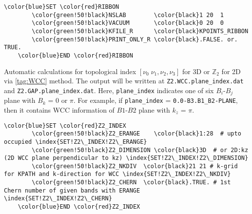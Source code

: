 \documentclass[a4paper,12pt]{scrartcl}
\makeatletter
\def\namedlabel#1#2{\begingroup
    #2%
    \def\@currentlabel{#2}%
    \phantomsection\label{#1}\endgroup
}
\newcommand{\textgreen}[1]{\textcolor{green!50!black}{\texttt{#1}}}
\makeatother
\begin{document}
\begin{description}
 \begin{Verbatim}[commandchars=\\\{\},gobble=4, frame=single, framesep=2mm, 
    label= Ribbon calculation setup,
    labelposition=bottomline]
    \color{blue}SET \color{red}RIBBON
        \color{green!50!black}NSLAB        \color{black}1 20  1
        \color{green!50!black}VACUUM       \color{black}0 20  0
        \color{green!50!black}KFILE_R      \color{black}KPOINTS_RIBBON
        \color{green!50!black}PRINT_ONLY_R \color{black}.FALSE. or. TRUE.
    \color{blue}END \color{red}RIBBON
 \end{Verbatim}


    \item[\namedlabel{tag:Z2}{Z2\_INDEX}]  Automatic calculations for topological index 
        $[\nu_0\; \nu_1, \nu_2, \nu_3]$ for 3D or $\mathbb{Z}_{2}$ for 2D via \ref{tag:WCC} method. 
        The output will be written at \texttt{Z2.WCC.}\textgreen{plane\_index}\texttt{.dat} and
        \texttt{Z2.GAP.}\textgreen{plane\_index}\texttt{.dat}.
        Here, \textgreen{plane\_index} indicates one of six $B_i$-$B_j$ plane with $B_k$ = 0 or $\pi$.
        For example, if \textgreen{plane\_index} = \textgreen{0.0-B3.B1\_B2-PLANE}, then it contains
        WCC information of $B1$-$B2$ plane with $k_z$ = $\pi$.
        
 \begin{Verbatim}[commandchars=\\\{\},gobble=4, frame=single, framesep=2mm, 
    label= Z2 index calculation using WCC method,
    labelposition=bottomline]
    \color{blue}SET \color{red}Z2_INDEX
        \color{green!50!black}Z2_ERANGE    \color{black}1:28  # upto occupied \index{SET!Z2\_INDEX!Z2\_ERANGE}
        \color{green!50!black}Z2_DIMENSION \color{black}3D  # or 2D:kz (2D WCC plane perpendicular to kz) \index{SET!Z2\_INDEX!Z2\_DIMENSION}
        \color{green!50!black}Z2_NKDIV  \color{black}21 21 # k-grid for KPATH and k-direction for WCC \index{SET!Z2\_INDEX!Z2\_NKDIV}
        \color{green!50!black}Z2_CHERN  \color{black}.TRUE. # 1st Chern number of given bands with ERANGE \index{SET!Z2\_INDEX!Z2\_CHERN}
    \color{blue}END \color{red}Z2_INDEX
 \end{Verbatim}


\end{description}
\end{document}
